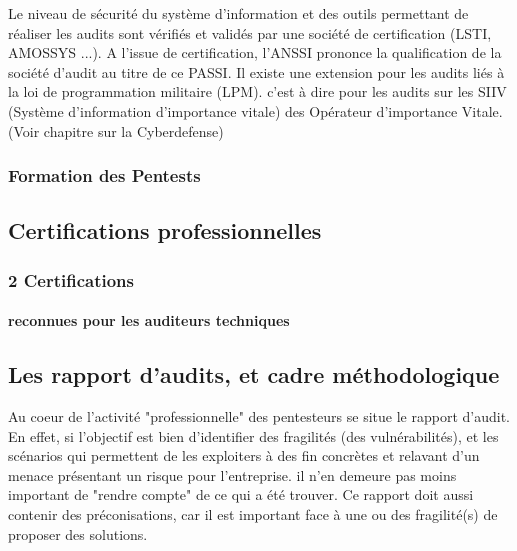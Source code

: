 Le niveau de sécurité du système d'information et des  outils permettant de réaliser les audits sont vérifiés et validés par une société de certification (LSTI, AMOSSYS ...). A l'issue de certification, l'ANSSI prononce la qualification de la société d'audit au titre de ce PASSI. Il existe une extension pour les audits liés à la loi de programmation militaire (LPM). c'est à dire pour les audits sur les SIIV (Système d'information d'importance vitale) des Opérateur d'importance Vitale. (Voir chapitre sur la Cyberdefense)

\subsubsection{Formation des Pentests}

\subsection {Certifications professionnelles}

\begin{frame}
\frametitle<presentation>{2 Certifications}
\framesubtitle<presentation>{reconnues pour les auditeurs techniques}
\end{frame}

\subsection {Les rapport d'audits, et cadre méthodologique}

Au coeur de l'activité "professionnelle" des pentesteurs se situe le rapport d'audit.
En effet, si l'objectif est bien d'identifier des fragilités (des vulnérabilités), et les scénarios qui permettent de les exploiters à des fin concrètes et relavant d'un menace présentant un risque pour l'entreprise.
il n'en demeure pas moins important de "rendre compte" de ce qui a été trouver. Ce rapport doit aussi contenir des préconisations, car il est important face à une ou des fragilité(s) de proposer des solutions. 




